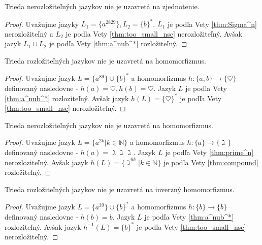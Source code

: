 \begin{theorem}
Trieda nerozložiteľných jazykov nie je uzavretá na zjednotenie.
\end{theorem}

\begin{proof}
Uvažujme jazyky $ L_1 = \lbrace a^{2829} \rbrace, L_2 = \lbrace b \rbrace^* $. $ L_1 $ je podľa Vety \ref{thm:Sigma^n} nerozložiteľný a $ L_2 $ je podla Vety \ref{thm:too_small_nsc} nerozložiteľný. Avšak jazyk $ L_1 \cup L_2 $ je podľa Vety \ref{thm:a^nub^*} rozložiteľný.
\end{proof}

\begin{theorem}
Trieda rozložiteľných jazykov nie je uzavretá na homomorfizmus.
\end{theorem}

\begin{proof}
Uvažujme jazyk $ L = \lbrace a^{89} \rbrace \cup \lbrace b \rbrace^* $ a homomorfizmus $ h : \lbrace a,b \rbrace \rightarrow \lbrace \heartsuit \rbrace $ definovaný nasledovne - $ h(a) = \heartsuit, h(b) = \heartsuit $. Jazyk $ L $ je podľa Vety \ref{thm:a^nub^*} rozloziteľný. Avšak jazyk $ h(L) = \lbrace \heartsuit \rbrace^*$ je podľa Vety \ref{thm:too_small_nsc} nerozložiteľný.
\end{proof}

\begin{theorem}
Trieda nerozložiteľných jazykov nie je uzavretá na homomorfizmus.
\end{theorem}

\begin{proof}
Uvažujme jazyk $ L = \lbrace a^{2k} | k \in \mathbb{N} \rbrace $ a homomorfizmus $ h : \lbrace a \rbrace \rightarrow \lbrace \gimel \rbrace $ definovaný nasledovne - $ h(a) = \gimel\gimel\gimel $. Jazyk $ L $ je podľa Vety \ref{thm:prime^n} nerozloziteľný. Avšak jazyk $ h(L) = \lbrace \gimel^{6k} | k \in \mathbb{N} \rbrace$ je podľa Vety \ref{thm:compound} rozložiteľný.
\end{proof}

\begin{theorem}
Trieda rozložiteľných jazykov nie je uzavretá na inverzný homomorfizmus.
\end{theorem}

\begin{proof}
Uvažujme jazyk $ L = \lbrace a^{39} \rbrace \cup \lbrace b \rbrace^* $ a homomorfizmus $ h : \lbrace b \rbrace \rightarrow \lbrace b \rbrace $ definovaný nasledovne - $ h(b) = b $. Jazyk $ L $ je podľa Vety \ref{thm:a^nub^*} rozloziteľný. Avšak jazyk $ h^{-1}(L) = \lbrace b \rbrace^*$ je podľa Vety \ref{thm:too_small_nsc} nerozložiteľný.
\end{proof}

